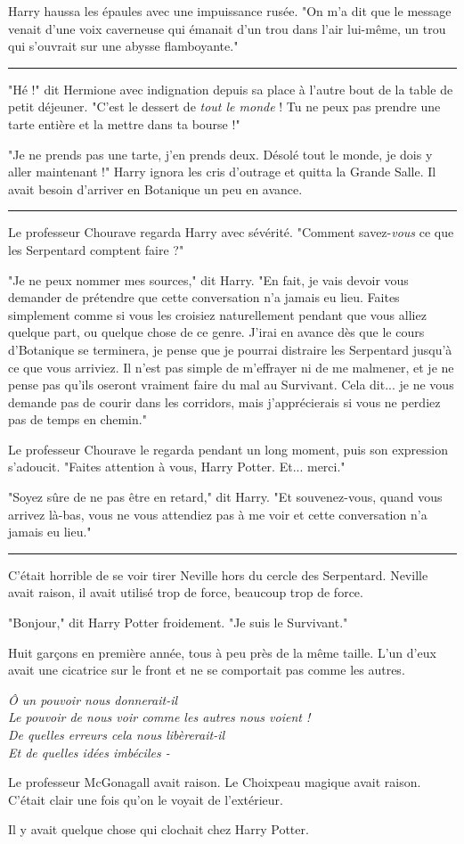 Harry haussa les épaules avec une impuissance rusée. "On m'a dit que le message venait d'une voix caverneuse qui émanait d'un trou dans l'air lui-même, un trou qui s'ouvrait sur une abysse flamboyante."
\par\noindent\rule{\textwidth}{0.4pt}
"Hé !" dit Hermione avec indignation depuis sa place à l'autre bout de la table de petit déjeuner. "C'est le dessert de \emph{tout le monde}  ! Tu ne peux pas prendre une tarte entière et la mettre dans ta bourse !"

"Je ne prends pas une tarte, j'en prends deux. Désolé tout le monde, je dois y aller maintenant !" Harry ignora les cris d'outrage et quitta la Grande Salle. Il avait besoin d'arriver en Botanique un peu en avance.
\par\noindent\rule{\textwidth}{0.4pt}
Le professeur Chourave regarda Harry avec sévérité. "Comment savez-\emph{vous}  ce que les Serpentard comptent faire ?"

"Je ne peux nommer mes sources," dit Harry. "En fait, je vais devoir vous demander de prétendre que cette conversation n'a jamais eu lieu. Faites simplement comme si vous les croisiez naturellement pendant que vous alliez quelque part, ou quelque chose de ce genre. J'irai en avance dès que le cours d'Botanique se terminera, je pense que je pourrai distraire les Serpentard jusqu'à ce que vous arriviez. Il n'est pas simple de m'effrayer ni de me malmener, et je ne pense pas qu'ils oseront vraiment faire du mal au Survivant. Cela dit... je ne vous demande pas de courir dans les corridors, mais j'apprécierais si vous ne perdiez pas de temps en chemin."

Le professeur Chourave le regarda pendant un long moment, puis son expression s'adoucit. "Faites attention à vous, Harry Potter. Et... merci."

"Soyez sûre de ne pas être en retard," dit Harry. "Et souvenez-vous, quand vous arrivez là-bas, vous ne vous attendiez pas à me voir et cette conversation n'a jamais eu lieu."
\par\noindent\rule{\textwidth}{0.4pt}
C'était horrible de se voir tirer Neville hors du cercle des Serpentard. Neville avait raison, il avait utilisé trop de force, beaucoup trop de force.

"Bonjour," dit Harry Potter froidement. "Je suis le Survivant."

Huit garçons en première année, tous à peu près de la même taille. L'un d'eux avait une cicatrice sur le front et ne se comportait pas comme les autres.

\emph{Ô un pouvoir nous donnerait-il} \\\emph{} \emph{Le pouvoir de nous voir comme les autres nous voient !} \\\emph{} \emph{De quelles erreurs cela nous libèrerait-il} \\\emph{} \emph{Et de quelles idées imbéciles -} 

Le professeur McGonagall avait raison. Le Choixpeau magique avait raison. C'était clair une fois qu'on le voyait de l'extérieur.

Il y avait quelque chose qui clochait chez Harry Potter.

